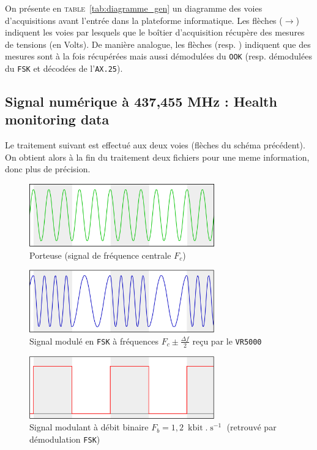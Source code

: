 \documentclass[twocolumn,pre,floats,aps,amsmath,amssymb]{revtex4}
\newenvironment{remark}[1][Remarque.]{\begin{trivlist}
\item[\hskip \labelsep {\bfseries #1}]}{\end{trivlist}}
\begin{document}
\begin{remark}
  On pr\'esente en \textsc{table}~\ref{tab:diagramme_gen} un diagramme des voies d'acquisitions avant l'entr\'ee dans la plateforme informatique. Les fl\`eches { \color{oneblue}{bleues} } ($\rightarrow$) indiquent les voies par lesquels que le bo\^itier d'acquisition r\'ecup\`ere des mesures de tensions (en Volts). De mani\`ere analogue, les fl\`eches { \color{rltgreen}{vertes} } (resp. { \color{rltred}{rouges} }) indiquent que des mesures sont \`a la fois r\'ecup\'er\'ees mais aussi d\'emodul\'ees du \texttt{OOK} (resp. d\'emodul\'ees du \texttt{FSK} et d\'ecod\'ees de l'\texttt{AX.25}).
\end{remark}

\subsection{Signal num\'erique \`a 437,455 MHz : Health monitoring data}

Le traitement suivant est effectu\'e aux deux voies (fl\`eches { \color{rltred}{rouges} } du sch\'ema pr\'ec\'edent). On obtient alors \`a la fin du traitement deux fichiers pour une meme information, donc plus de pr\'ecision.

\begin{figure}[h]
  \includegraphics[width=8cm]{porteuse.png}
  \caption{Porteuse (signal de fr\'equence centrale $F_c$)}
  \label{fig:signal_porteur}
\end{figure}

\begin{figure}[h]
  \includegraphics[width=8cm]{signal_mod.png}
  \caption{Signal modul\'e en \texttt{FSK} \`a fr\'equences $F_c \pm \frac{\Delta f}{2}$ re\c{c}u  par le \texttt{VR5000}}
  \label{fig:signal_module}
\end{figure}

\begin{figure}[h]
  \includegraphics[width=8cm]{signal_demod.png}
  \caption{Signal modulant \`a d\'ebit binaire $F_b = 1,2 \ \operatorname{kbit}.\operatorname{s}^{-1}$ (retrouv\'e par d\'emodulation \texttt{FSK})}
  \label{fig:signal_modulant}
\end{figure}
\end{document}
